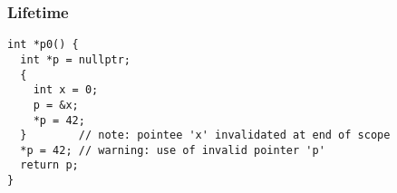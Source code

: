 \begin{frame}[fragile]
    \frametitle{Lifetime}
    \begin{center}
        \begin{minipage}{0.8\textwidth}
            \begin{lstlisting}[caption=生命周期分析与垂悬引用]
int *p0() {
  int *p = nullptr;
  {
    int x = 0;
    p = &x;
    *p = 42;
  }        // note: pointee 'x' invalidated at end of scope
  *p = 42; // warning: use of invalid pointer 'p'
  return p;
}
            \end{lstlisting}

        \end{minipage}
    \end{center}

\end{frame}
